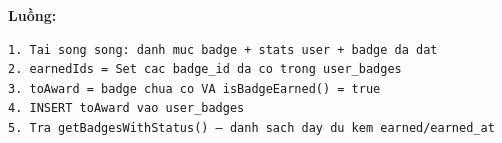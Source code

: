 \documentclass[12pt,a4paper]{article}
\newenvironment{Shaded}{%
  \VerbatimEnvironment
  \begin{quote}\small\ttfamily
}{%
  \end{quote}%
}
\begin{document}
\begin{Shaded}
\begin{Highlighting}[]
  \OperatorTok{=}  \NormalTok{ [])}\KeywordTok{=\textgreater{}}\NormalTok{))}\OperatorTok{;}
  \OperatorTok{=}\KeywordTok{=\textgreater{}} \OperatorTok{!}\NormalTok{) }\OperatorTok{\&\&} \OperatorTok{,}\OperatorTok{;}

   \OperatorTok{\textgreater{}} \NormalTok{) \{}
    \OperatorTok{=} \NormalTok{(}\NormalTok{)}\NormalTok{(}
\KeywordTok{=\textgreater{}}\OperatorTok{:}\OperatorTok{,}\OperatorTok{:}\NormalTok{ \}))}\OperatorTok{,}
\NormalTok{    )}\OperatorTok{;}
    \OperatorTok{\&\&} \OperatorTok{!==} \StringTok{\textquotesingle{}23505\textquotesingle{}}\NormalTok{) }\NormalTok{)}\OperatorTok{;}
\NormalTok{  \}}
   \OperatorTok{;}
\NormalTok{\}}

\end{Highlighting}
\end{Shaded}

\textbf{Luồng:}

\begin{verbatim}
1. Tai song song: danh muc badge + stats user + badge da dat
2. earnedIds = Set cac badge_id da co trong user_badges
3. toAward = badge chua co VA isBadgeEarned() = true
4. INSERT toAward vao user_badges
5. Tra getBadgesWithStatus() — danh sach day du kem earned/earned_at
\end{verbatim}
\end{document}
